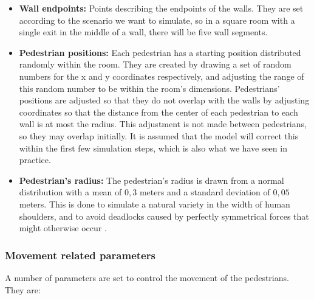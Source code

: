 \begin{itemize}
    \item \textbf{Wall endpoints:} Points describing the endpoints of the 
        walls. They are set according to the scenario we want to simulate, so 
        in a square room with a single exit in the middle of a wall, there 
        will be five wall segments.

    \item \textbf{Pedestrian positions:} Each pedestrian has a starting position 
        distributed randomly within the room. They are created by drawing a 
        set of random numbers for the x and y coordinates respectively, and 
        adjusting the range of this random number to be within the room's 
        dimensions. Pedestrians' positions are adjusted so that they do not overlap 
        with the walls by adjusting coordinates so that the distance from the 
        center of each pedestrian to each wall is at most the radius. This 
        adjustment is not made between pedestrians, so they may overlap initially. 
        It is assumed that the model will correct this within the first few 
        simulation steps, which is also what we have seen in practice.

    \item \textbf{Pedestrian's radius:} The pedestrian's radius is drawn from a normal 
        distribution with a mean of $0,3$ meters and a standard deviation of 
        $0,05$ meters. This is done to simulate a natural variety in the width 
        of human shoulders, and to avoid deadlocks caused by perfectly 
        symmetrical forces that might otherwise occur \cite{helbing00}.
\end{itemize}

\subsubsection{Movement related parameters}
A number of parameters are set to control the movement of the pedestrians. They 
are:

